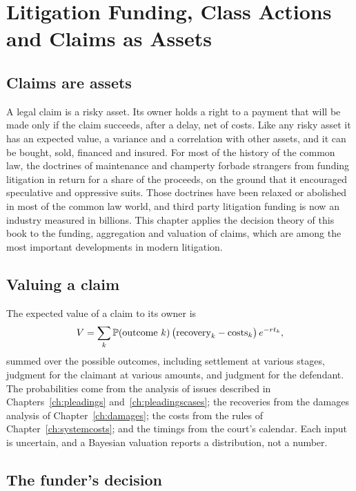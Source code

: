 \chapter{Litigation Funding, Class Actions and Claims as Assets}
\label{ch:funding}

\section{Claims are assets}

A legal claim is a risky asset. Its owner holds a right to a payment that will be made only if the claim succeeds, after a delay, net of costs. Like any risky asset it has an expected value, a variance and a correlation with other assets, and it can be bought, sold, financed and insured. For most of the history of the common law, the doctrines of maintenance and champerty forbade strangers from funding litigation in return for a share of the proceeds, on the ground that it encouraged speculative and oppressive suits. Those doctrines have been relaxed or abolished in most of the common law world, and third party litigation funding is now an industry measured in billions. This chapter applies the decision theory of this book to the funding, aggregation and valuation of claims, which are among the most important developments in modern litigation.

\section{Valuing a claim}

The expected value of a claim to its owner is
\begin{equation}
V = \sum_k \mathbb{P}(\text{outcome } k)\,\big(\text{recovery}_k - \text{costs}_k\big)\,e^{-r t_k},
\end{equation}
summed over the possible outcomes, including settlement at various stages, judgment for the claimant at various amounts, and judgment for the defendant. The probabilities come from the analysis of issues described in Chapters~\ref{ch:pleadings} and~\ref{ch:pleadingscases}; the recoveries from the damages analysis of Chapter~\ref{ch:damages}; the costs from the rules of Chapter~\ref{ch:systemcosts}; and the timings from the court's calendar. Each input is uncertain, and a Bayesian valuation reports a distribution, not a number.

\section{The funder's decision}

